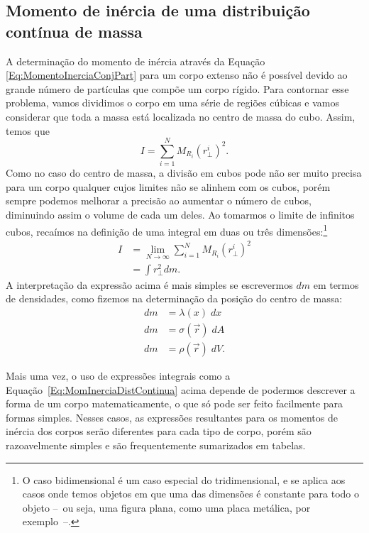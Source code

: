 \subsection{Momento de inércia de uma distribuição contínua de massa}

A determinação do momento de inércia através da Equação \eqref{Eq:MomentoInerciaConjPart} para um corpo extenso não é possível devido ao grande número de partículas que compõe um corpo rígido. Para contornar esse problema, vamos dividimos o corpo em uma série de regiões cúbicas e vamos considerar que toda a massa está localizada no centro de massa do cubo. Assim, temos que
\begin{equation}
    I = \sum_{i = 1}^N M_{R_i} (r_\perp^i)^2.
\end{equation}
%
Como no caso do centro de massa, a divisão em cubos pode não ser muito precisa para um corpo qualquer cujos limites não se alinhem com os cubos, porém sempre podemos melhorar a precisão ao aumentar o número de cubos, diminuindo assim o volume de cada um deles. Ao tomarmos o limite de infinitos cubos, recaímos na definição de uma integral em duas ou três dimensões:\footnote{O caso bidimensional é um caso especial do tridimensional, e se aplica aos casos onde temos objetos em que uma das dimensões é constante para todo o objeto --~ou seja, uma figura plana, como uma placa metálica, por exemplo~--.}
\begin{align}
    I &= \lim_{N \to \infty} \sum_{i = 1}^N M_{R_i} (r_\perp^i)^2 \\
    &= \int r_\perp^2 dm. \label{Eq:MomInerciaDistContinua}
\end{align}
%
A interpretação da expressão acima é mais simples se escrevermos $dm$ em termos de densidades, como fizemos na determinação da posição do centro de massa:
\begin{align}
    dm &= \lambda(x) \; dx \\
    dm &= \sigma(\vec{r}) \;dA \\
    dm &= \rho(\vec{r}) \; dV. \label{Eq:DiferencialDeMassaVolume}
\end{align}

Mais uma vez, o uso de expressões integrais como a Equação~\eqref{Eq:MomInerciaDistContinua} acima depende de podermos descrever a forma de um corpo matematicamente, o que só pode ser feito facilmente para formas simples. Nesses casos, as expressões resultantes para os momentos de inércia dos corpos serão diferentes para cada tipo de corpo, porém são razoavelmente simples e são frequentemente sumarizados em tabelas.

